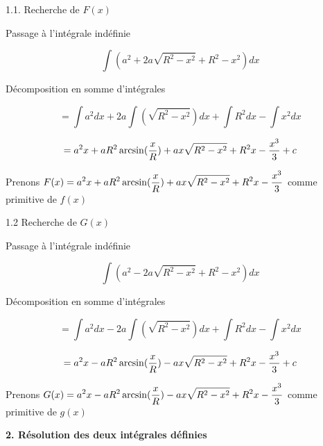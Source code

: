 \documentclass[10pt]{article}
\begin{document}
1.1. Recherche de $F(x)$ \vspace{0.5cm}

\hspace{0.8cm} Passage à l'intégrale indéfinie\vspace{0.2cm}

$$\int (a^2+2a\sqrt{R^2-x^2}+R^2-x^2)dx$$\vspace{0.01cm}

\hspace{0.8cm} Décomposition en somme d'intégrales\vspace{0.2cm}

$$=\int a^2dx + 2a\int(\sqrt{R^2-x^2})dx + \int R^2dx - \int x^2dx$$

$$=a^2x + aR^2\arcsin({x\over{R}}) + ax\sqrt{R^2-x^2} + R^2x - {x^3\over{3}} + c$$

\begin{center}
\hspace{0.8cm} Prenons $\displaystyle{F(x)=a^2x + aR^2\arcsin({x\over{R}}) + ax\sqrt{R^2-x^2} + R^2x - {x^3\over{3}}}$ comme primitive de $f(x)$\vspace{0.2cm}
\end{center}

1.2 Recherche de $G(x)$ \vspace{0.5cm}

\hspace{0.8cm} Passage à l'intégrale indéfinie\vspace{0.2cm}

$$\int (a^2-2a\sqrt{R^2-x^2}+R^2-x^2)dx$$\vspace{0.01cm}

\hspace{0.8cm} Décomposition en somme d'intégrales\vspace{0.2cm}

$$=\int a^2dx - 2a\int(\sqrt{R^2-x^2})dx + \int R^2dx - \int x^2dx$$

$$=a^2x - aR^2\arcsin({x\over{R}}) - ax\sqrt{R^2-x^2} + R^2x - {x^3\over{3}} + c$$

\begin{center}
\hspace{0.8cm} Prenons $\displaystyle{G(x)=a^2x - aR^2\arcsin({x\over{R}}) - ax\sqrt{R^2-x^2} + R^2x - {x^3\over{3}}}$ comme primitive de $g(x)$\vspace{0.2cm}
\end{center}

\textbf{2. Résolution des deux intégrales définies}\vspace{0.5cm}
\end{document}
